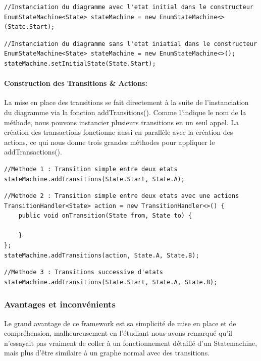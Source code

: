 \documentclass[french, 12pt, a4paper]{article}
\begin{document}
            \begin{lstlisting}
//Instanciation du diagramme avec l'etat initial dans le constructeur
EnumStateMachine<State> stateMachine = new EnumStateMachine<>(State.Start);
            \end{lstlisting}
            
            \begin{lstlisting}
//Instanciation du diagramme sans l'etat iniatial dans le constructeur
EnumStateMachine<State> stateMachine = new EnumStateMachine<>();
stateMachine.setInitialState(State.Start);
            \end{lstlisting}
            
            \paragraph{Construction des Transitions \& Actions: }
            La mise en place des transitions se fait directement à la suite de l'instanciation du diagramme via la fonction addTransitions(). Comme l'indique le nom de la méthode, nous pouvons instancier plusieurs transitions en un seul appel. La création des transactions fonctionne aussi en parallèle avec la création des actions, ce qui nous donne trois grandes méthodes pour appliquer le addTransactions().
            
            \begin{lstlisting}
//Methode 1 : Transition simple entre deux etats
stateMachine.addTransitions(State.Start, State.A);
            \end{lstlisting}
            
            \begin{lstlisting}
//Methode 2 : Transition simple entre deux etats avec une actions
TransitionHandler<State> action = new TransitionHandler<>() {
    public void onTransition(State from, State to) {
        
    }
};
stateMachine.addTransitions(action, State.A, State.B);
            \end{lstlisting}
            
            \begin{lstlisting}
//Methode 3 : Transitions successive d'etats
stateMachine.addTransitions(State.Start, State.A, State.B);
            \end{lstlisting}
            
        \subsubsection{Avantages et inconvénients}
        Le grand avantage de ce framework est sa simplicité de mise en place et de compréhension, malheureusement en l'étudiant nous avons remarqué qu'il n'essayait pas vraiment de coller à un fonctionnement détaillé d'un Statemachine, mais plus d'être similaire à un graphe normal avec des transitions.
\end{document}
